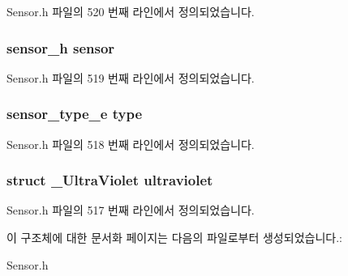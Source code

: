 Sensor.\-h 파일의 520 번째 라인에서 정의되었습니다.

\hypertarget{struct___ultra_violet_extend_a5bae9b7801bc3808411925cde81d3f26}{
\subsubsection[{sensor}]{\setlength{\rightskip}{0pt plus 5cm}sensor\-\_\-h sensor}}\label{struct___ultra_violet_extend_a5bae9b7801bc3808411925cde81d3f26}


Sensor.\-h 파일의 519 번째 라인에서 정의되었습니다.

\hypertarget{struct___ultra_violet_extend_abffb09766da2fc510a79bb51f82a36e1}{
\subsubsection[{type}]{\setlength{\rightskip}{0pt plus 5cm}sensor\-\_\-type\-\_\-e type}}\label{struct___ultra_violet_extend_abffb09766da2fc510a79bb51f82a36e1}


Sensor.\-h 파일의 518 번째 라인에서 정의되었습니다.

\hypertarget{struct___ultra_violet_extend_a5ecfbeb3a1030d60f8478b26f0ea7fb0}{
\subsubsection[{ultraviolet}]{\setlength{\rightskip}{0pt plus 5cm}struct {\bf \-\_\-\-Ultra\-Violet} ultraviolet}}\label{struct___ultra_violet_extend_a5ecfbeb3a1030d60f8478b26f0ea7fb0}


Sensor.\-h 파일의 517 번째 라인에서 정의되었습니다.



이 구조체에 대한 문서화 페이지는 다음의 파일로부터 생성되었습니다.\-:\begin{DoxyCompactItemize}
\item 
Sensor.\-h\end{DoxyCompactItemize}
